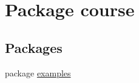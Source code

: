\hypertarget{namespacecourse}{}\section{Package course}
\label{namespacecourse}
\subsection*{Packages}
\begin{DoxyCompactItemize}
\item 
package \hyperlink{namespacecourse_1_1examples}{examples}
\end{DoxyCompactItemize}
